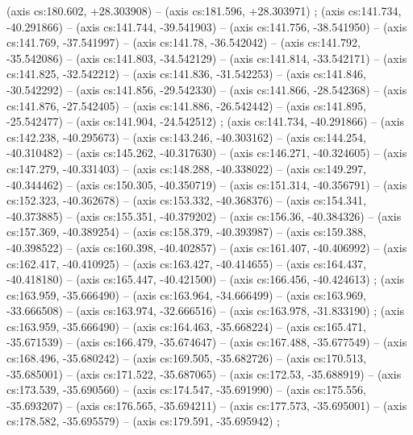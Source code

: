     (axis cs:180.602,    +28.303908) --  (axis cs:181.596,    +28.303971) ;
    (axis cs:141.734,    -40.291866) --  (axis cs:141.744,    -39.541903) --  (axis cs:141.756,    -38.541950) --  (axis cs:141.769,    -37.541997) --  (axis cs:141.78,    -36.542042) --  (axis cs:141.792,    -35.542086) --  (axis cs:141.803,    -34.542129) --  (axis cs:141.814,    -33.542171) --  (axis cs:141.825,    -32.542212) --  (axis cs:141.836,    -31.542253) --  (axis cs:141.846,    -30.542292) --  (axis cs:141.856,    -29.542330) --  (axis cs:141.866,    -28.542368) --  (axis cs:141.876,    -27.542405) --  (axis cs:141.886,    -26.542442) --  (axis cs:141.895,    -25.542477) --  (axis cs:141.904,    -24.542512) ;
    (axis cs:141.734,    -40.291866) --  (axis cs:142.238,    -40.295673) --  (axis cs:143.246,    -40.303162) --  (axis cs:144.254,    -40.310482) --  (axis cs:145.262,    -40.317630) --  (axis cs:146.271,    -40.324605) --  (axis cs:147.279,    -40.331403) --  (axis cs:148.288,    -40.338022) --  (axis cs:149.297,    -40.344462) --  (axis cs:150.305,    -40.350719) --  (axis cs:151.314,    -40.356791) --  (axis cs:152.323,    -40.362678) --  (axis cs:153.332,    -40.368376) --  (axis cs:154.341,    -40.373885) --  (axis cs:155.351,    -40.379202) --  (axis cs:156.36,    -40.384326) --  (axis cs:157.369,    -40.389254) --  (axis cs:158.379,    -40.393987) --  (axis cs:159.388,    -40.398522) --  (axis cs:160.398,    -40.402857) --  (axis cs:161.407,    -40.406992) --  (axis cs:162.417,    -40.410925) --  (axis cs:163.427,    -40.414655) --  (axis cs:164.437,    -40.418180) --  (axis cs:165.447,    -40.421500) --  (axis cs:166.456,    -40.424613) ;
    (axis cs:163.959,    -35.666490) --  (axis cs:163.964,    -34.666499) --  (axis cs:163.969,    -33.666508) --  (axis cs:163.974,    -32.666516) --  (axis cs:163.978,    -31.833190) ;
    (axis cs:163.959,    -35.666490) --  (axis cs:164.463,    -35.668224) --  (axis cs:165.471,    -35.671539) --  (axis cs:166.479,    -35.674647) --  (axis cs:167.488,    -35.677549) --  (axis cs:168.496,    -35.680242) --  (axis cs:169.505,    -35.682726) --  (axis cs:170.513,    -35.685001) --  (axis cs:171.522,    -35.687065) --  (axis cs:172.53,    -35.688919) --  (axis cs:173.539,    -35.690560) --  (axis cs:174.547,    -35.691990) --  (axis cs:175.556,    -35.693207) --  (axis cs:176.565,    -35.694211) --  (axis cs:177.573,    -35.695001) --  (axis cs:178.582,    -35.695579) --  (axis cs:179.591,    -35.695942) ;
